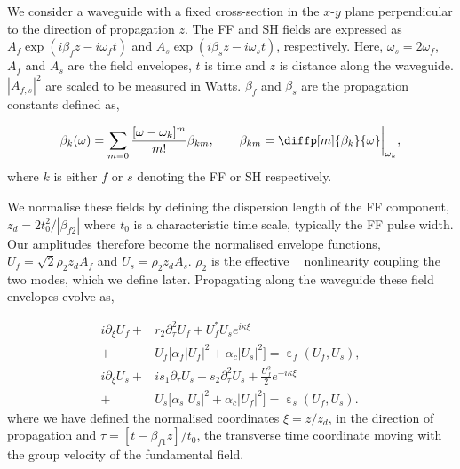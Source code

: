 \documentclass[reprint,
 amsmath,amssymb,
 pra,
]{revtex4-1}
\newcommand{\eq}[1]{
\begin{equation}\begin{aligned}
#1
\end{aligned}\end{equation}}
\DeclareMathOperator{\chitwo}{ {\chi}^{(2)} }
\DeclareMathOperator{\eps}{\varepsilon}
\begin{document}
We consider a waveguide with a fixed cross-section in the $x$-$y$ plane perpendicular to the direction of propagation $z$.  The FF and SH fields are expressed as $A_f\exp(i\beta_f z-i\omega_f t)$ and $A_s\exp(i\beta_s z-i\omega_s t)$, respectively.
Here,  $\omega_s=2\omega_f$, $A_f$ and $A_s$ are the field envelopes,  $t$ is time and $z$ is distance along the waveguide. $|A_{f,s}|^2$ are scaled to be measured in Watts. $\beta_f$ and $\beta_s$ are the propagation constants defined as,
\eq{
\beta_k (\omega) = \sum_{m=0} \frac{[\omega - \omega_k]^m}{m!} \beta_{km}, \qquad
\beta_{km}=\diffp[m]{\beta_k}{\omega}\bigg|_{\omega_k},
}
where $k$ is either $f$ or $s$ denoting the FF or SH respectively.  

We normalise these fields by defining the dispersion length of the FF component, $z_d = 2t_0^2/|\beta_{f2}|$ where $t_0$ is a characteristic time scale, typically the FF pulse width. Our amplitudes therefore become the normalised envelope functions, $U_f = \sqrt{2} \rho_2 z_d A_f$ and $U_s = \rho_2 z_d A_s$. $\rho_2$ is the effective $\chitwo$ nonlinearity coupling the two modes, which we define later. Propagating along the waveguide these field envelopes evolve as,
\eq{\label{e:model}
i\partial_\xi U_f +& r_2 \partial_\tau^2 U_f + U_f^* U_s e^{i\kappa \xi} \\+& U_f\big[\alpha_f|U_f|^2 + \alpha_c|U_s|^2\big] = \eps_f(U_f,U_s),\\
i\partial_\xi U_s +& is_1\partial_\tau U_s + s_2 \partial_\tau^2 U_s + \frac{U_f^2}{2} e^{-i\kappa \xi} \\ +& U_s\big[\alpha_s|U_s|^2 + \alpha_c|U_f|^2\big] = \eps_s(U_f,U_s).
}
where we have defined the normalised coordinates $\xi = z/z_d$, in the direction of propagation and $\tau = [t - \beta_{f1} z]/t_0$, the transverse time coordinate moving with the group velocity of the fundamental field. 
\end{document}
